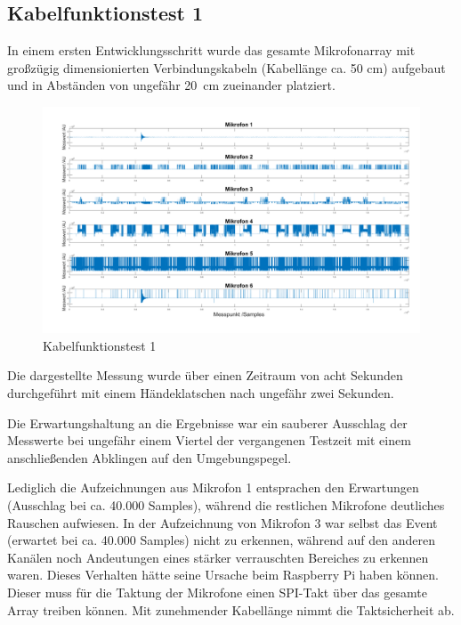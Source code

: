 \subsection{Kabelfunktionstest 1}

In einem ersten Entwicklungsschritt wurde das gesamte Mikrofonarray mit großzügig dimensionierten Verbindungskabeln (Kabellänge ca. 50 cm) aufgebaut und in Abständen von ungefähr \SI{20}{cm} zueinander platziert. 

\begin{figure}[h]
	\begin{center}
		\includegraphics[scale=0.1]{Sections/Tests/Test_1_d}
	\end{center}
	\caption{Kabelfunktionstest 1}
	\label{fig:Test_1_d}
\end{figure}

Die dargestellte Messung wurde über einen Zeitraum von acht Sekunden durchgeführt mit einem Händeklatschen nach ungefähr zwei Sekunden.

Die Erwartungshaltung an die Ergebnisse war ein sauberer Ausschlag der Messwerte bei ungefähr einem Viertel der vergangenen Testzeit mit einem anschließenden Abklingen auf den Umgebungspegel.

Lediglich die Aufzeichnungen aus Mikrofon 1 entsprachen den Erwartungen (Ausschlag bei ca. 40.000 Samples), während die restlichen Mikrofone deutliches Rauschen aufwiesen. In der Aufzeichnung von Mikrofon 3 war selbst das Event (erwartet bei ca. 40.000 Samples) nicht zu erkennen, während auf den anderen Kanälen noch Andeutungen eines stärker verrauschten Bereiches zu erkennen waren. Dieses Verhalten hätte seine Ursache beim Raspberry Pi haben können. Dieser muss für die Taktung der Mikrofone einen SPI-Takt über das gesamte Array treiben können. Mit zunehmender Kabellänge nimmt die Taktsicherheit ab. 

